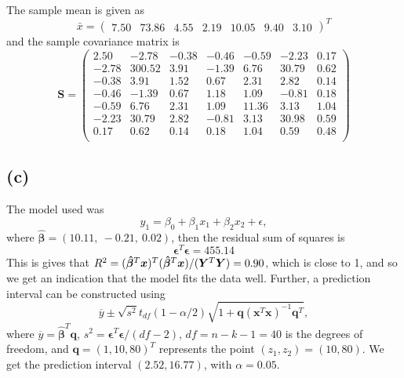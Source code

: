 \message{ !name(examination.tex)}\documentclass[one column]{report}
\renewcommand{\b}[1]{\bm{#1}}
\begin{document}
The sample mean is given as
\begin{equation*}
  \bar{x} =
  \begin{pmatrix}
    7.50 & 73.86 & 4.55 & 2.19 & 10.05 & 9.40 & 3.10 
  \end{pmatrix}^T
\end{equation*}
and the sample covariance matrix is
\begin{equation*}
  \b S =
  \begin{pmatrix}
    2.50 & -2.78 & -0.38 & -0.46 & -0.59 & -2.23 & 0.17 \\ 
    -2.78 & 300.52 & 3.91 & -1.39 & 6.76 & 30.79 & 0.62 \\ 
    -0.38 & 3.91 & 1.52 & 0.67 & 2.31 & 2.82 & 0.14 \\ 
    -0.46 & -1.39 & 0.67 & 1.18 & 1.09 & -0.81 & 0.18 \\ 
    -0.59 & 6.76 & 2.31 & 1.09 & 11.36 & 3.13 & 1.04 \\ 
    -2.23 & 30.79 & 2.82 & -0.81 & 3.13 & 30.98 & 0.59 \\ 
    0.17 & 0.62 & 0.14 & 0.18 & 1.04 & 0.59 & 0.48 \\ 
  \end{pmatrix}
\end{equation*}

\subsection*{(c)}
\label{sec:c-4}

The model used was
\begin{equation*}
  y_1 = \beta_0 + \beta_1 x_1 + \beta_2 x_2 + \epsilon,
\end{equation*}
where $\hat{\b \beta} = (10.11,\   -0.21,\    0.02)$, then the
residual sum of squares is
\begin{equation*}
  \b \epsilon^{T} \b \epsilon = 455.14
\end{equation*}
This is gives that $R^{2} = (\b \hat{\b\beta}^{T} \b x)^{T} (\b \hat{\b\beta}^{T} \b x)/(\b Y^{T} \b Y) = 0.90$, which is close to 1, and so
we get an indication that the model fits the data well. 
Further, a prediction interval can be constructed using
\begin{equation*}
  \overline y \pm \sqrt{s^{2}}t_{df}(1 - \alpha/2)\sqrt{1 + \b q (\b x^{T} \b
    x)^{-1}\b q^{T}},
\end{equation*}
where $\overline y = \hat{\b\beta}^{T} \b q$, $s^{2} =\b \epsilon^{T} \b \epsilon / (df - 2) $, $df = n - k - 1
= 40$ is the degrees of freedom, and $\b q = (1, 10, 80)^{T}$ represents
the point $(z_{1}, z_{2}) = (10, 80)$.  We get the prediction interval $(2.52, 16.77)$, with $\alpha = 0.05$.
\end{document}
